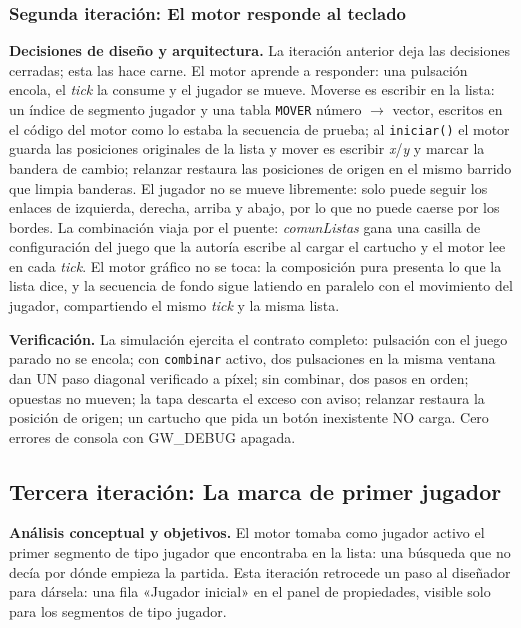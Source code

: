 \subsubsection{Segunda iteración: El motor responde al teclado}

\textbf{Decisiones de diseño y arquitectura.} La iteración anterior
deja las decisiones cerradas; esta las hace carne. El motor aprende a
responder: una pulsación encola, el \textit{tick} la consume y el
jugador se mueve. Moverse es escribir en la lista: un índice de
segmento jugador y una tabla \texttt{MOVER} número $\rightarrow$ vector,
escritos en el código del motor como lo estaba la secuencia de prueba;
al \texttt{iniciar()} el motor guarda las posiciones originales de la
lista y mover es escribir \emph{x}/\emph{y} y marcar la bandera de
cambio; relanzar restaura las posiciones de origen en el mismo barrido
que limpia banderas. El jugador no se mueve libremente: solo puede
seguir los enlaces de izquierda, derecha, arriba y abajo, por lo que no
puede caerse por los bordes. La combinación viaja por el puente:
\emph{comunListas} gana una casilla de configuración del juego que la
autoría escribe al cargar el cartucho y el motor lee en cada
\textit{tick}. El motor gráfico no se toca: la composición pura
presenta lo que la lista dice, y la secuencia de fondo sigue latiendo
en paralelo con el movimiento del jugador, compartiendo el mismo
\textit{tick} y la misma lista.

\textbf{Verificación.} La simulación ejercita el contrato completo:
pulsación con el juego parado no se encola; con \texttt{combinar}
activo, dos pulsaciones en la misma ventana dan UN paso diagonal
verificado a píxel; sin combinar, dos pasos en orden; opuestas no
mueven; la tapa descarta el exceso con aviso; relanzar restaura la
posición de origen; un cartucho que pida un botón inexistente NO
carga. Cero errores de consola con GW\_DEBUG apagada.

\subsection{Tercera iteración: La marca de primer jugador}
\label{sec:F3PrimerJugador}

\textbf{Análisis conceptual y objetivos.} El motor tomaba como jugador
activo el primer segmento de tipo jugador que encontraba en la lista:
una búsqueda que no decía por dónde empieza la partida. Esta iteración
retrocede un paso al diseñador para dársela: una fila «Jugador
inicial» en el panel de propiedades, visible solo para los segmentos
de tipo jugador.


